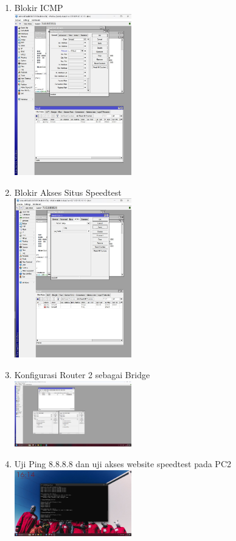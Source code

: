 \begin{enumerate}
	\item Blokir ICMP\\
	\includegraphics[width=0.4\textwidth]{p4/img/block1.jpg}
	\item Blokir Akses Situs Speedtest\\
	\includegraphics[width=0.4\textwidth]{p4/img/block2.jpg}
	\item Konfigurasi Router 2 sebagai Bridge\\
	\includegraphics[width=0.4\textwidth]{p4/img/bridge.jpg}
	\item Uji Ping 8.8.8.8 dan uji akses website speedtest pada PC2\\
	\includegraphics[width=0.4\textwidth]{p4/img/ping_blocked.jpg}

\end{enumerate}
